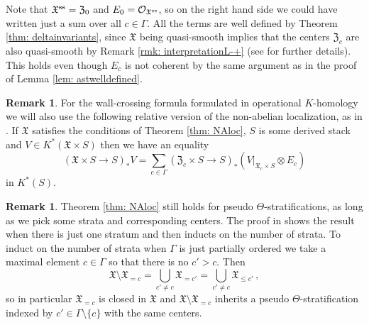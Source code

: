 \documentclass[12pt]{amsart}
\theoremstyle{definition}
\newtheorem{remark}[definition]{Remark}
\newcommand{\CO}{{\mathcal O}}
\newcommand{\1}{\mathbf 1}
\newcommand{\FX}{{\mathfrak{X}}}
\newcommand{\FZ}{{\mathfrak{Z}}}
\begin{document}
Note that $\FX^{\textup{ss}}=\FZ_0$ and $E_0=\CO_{\FX^{\textup{ss}}}$, so on the right hand side we could have written just a sum over all $c\in \Gamma$. All the terms are well defined by Theorem \ref{thm: deltainvariants}, since $\FX$ being quasi-smooth implies that the centers $\FZ_c$ are also quasi-smooth by Remark \ref{rmk: interpretationL-+} (see \cite[Lemma 3.1.4]{HLderived} for further details). This holds even though $E_c$ is not coherent by the same argument as in the proof of Lemma \ref{lem: astwelldefined}.


\begin{remark}\label{rmk: relativeNAL}
For the wall-crossing formula formulated in operational $K$-homology we will also use the following relative version of the non-abelian localization, as in \cite[Proposition 6.10]{HLHgauged}. If $\FX$ satisfies the conditions of Theorem \ref{thm: NAloc}, $S$ is some derived stack and $V\in K^\ast(\FX\times S)$ then we have an equality
\[(\FX\times S\to S)_\ast V=\sum_{c\in \Gamma}(\FZ_c\times S\to S)_\ast (V|_{\FX_c\times S}\otimes E_c) \]
in $K^\ast(S)$.
\end{remark}


\begin{remark}\label{rmk: pseudoNAL}
Theorem \ref{thm: NAloc} still holds for pseudo $\Theta$-stratifications, as long as we pick some strata and corresponding centers. The proof in \cite{HLNAL} shows the result when there is just one stratum and then inducts on the number of strata. To induct on the number of strata when $\Gamma$ is just partially ordered we take a maximal element $c\in \Gamma$ so that there is no $c'>c$. Then 
\[\FX\setminus \FX_{=c}=\bigcup_{c'\neq c}\FX_{=c'}=\bigcup_{c'\neq c}\FX_{\leq c'}\,,\]
so in particular $\FX_{=c}$ is closed in $\FX$ and $\FX\setminus \FX_{=c}$ inherits a pseudo $\Theta$-stratification indexed by $c'\in \Gamma\setminus \{c\}$ with the same centers.
\end{remark}
\end{document}
